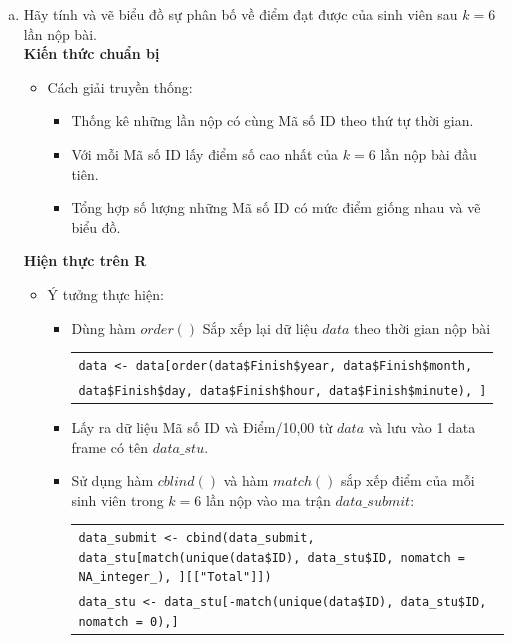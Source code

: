 \documentclass[a4paper]{article}
\theoremstyle{definition}
\begin{document}
\begin{enumerate}[a)]
    \bf\item \label{it:k6} Hãy tính và vẽ biểu đồ sự phân bố về điểm đạt được của sinh viên sau $k=6$ lần nộp bài.\\[6pt]
    \bf Kiến thức chuẩn bị\normalfont
    \begin{itemize}
        \item Cách giải truyền thống:
        \begin{itemize}
            \item Thống kê những lần nộp có cùng Mã số ID theo thứ tự thời gian.
            \item Với mỗi Mã số ID lấy điểm số cao nhất của $k=6$ lần nộp bài đầu tiên.
            \item Tổng hợp số lượng những Mã số ID có mức điểm giống nhau và vẽ biểu đồ.
        \end{itemize}
    \end{itemize}
    \bf Hiện thực trên R\normalfont
    \begin{itemize}
        \item Ý tưởng thực hiện:
        \begin{itemize}
            \item Dùng hàm $order()$ Sắp xếp lại dữ liệu $data$ theo thời gian nộp bài
            \begin{center}
                \begin{tabular}{p{13cm}}  
                    \texttt{data <- data[order(data\$Finish\$year, data\$Finish\$month, }\\
                    \texttt{data\$Finish\$day, data\$Finish\$hour, data\$Finish\$minute), ]}
                \end{tabular}
            \end{center}
            \item Lấy ra dữ liệu Mã số ID và Điểm/10,00 từ $data$ và lưu vào 1 data frame có tên $data\_stu$.
            \item Sử dụng hàm $cblind()$ và hàm $match()$ sắp xếp điểm của mỗi sinh viên trong $k=6$ lần nộp vào ma trận $data\_submit$:
            \begin{center}
                \begin{tabular}{p{13cm}}
                   \texttt{data\_submit <- cbind(data\_submit, data\_stu[match(unique(data\$ID), data\_stu\$ID, nomatch = NA\_integer\_), ][["Total"]])}\\
                    \texttt{data\_stu <- data\_stu[-match(unique(data\$ID), data\_stu\$ID, nomatch = 0),]}

\end{tabular}
\end{center}
\end{itemize}
\end{itemize}
\end{enumerate}
\end{document}
